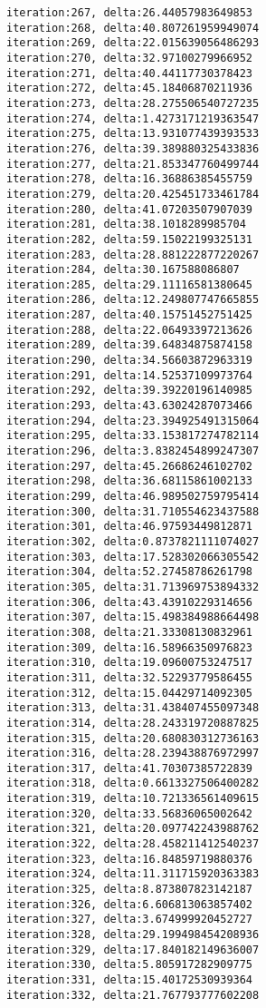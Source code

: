 \documentclass[11pt]{article}
\begin{document}
\begin{Verbatim}[commandchars=\\\{\}]
iteration:267, delta:26.44057983649853
iteration:268, delta:40.807261959949074
iteration:269, delta:22.015639056486293
iteration:270, delta:32.97100279966952
iteration:271, delta:40.44117730378423
iteration:272, delta:45.18406870211936
iteration:273, delta:28.275506540727235
iteration:274, delta:1.4273171219363547
iteration:275, delta:13.931077439393533
iteration:276, delta:39.389880325433836
iteration:277, delta:21.853347760499744
iteration:278, delta:16.36886385455759
iteration:279, delta:20.425451733461784
iteration:280, delta:41.07203507907039
iteration:281, delta:38.1018289985704
iteration:282, delta:59.15022199325131
iteration:283, delta:28.881222877220267
iteration:284, delta:30.167588086807
iteration:285, delta:29.11116581380645
iteration:286, delta:12.249807747665855
iteration:287, delta:40.15751452751425
iteration:288, delta:22.06493397213626
iteration:289, delta:39.64834875874158
iteration:290, delta:34.56603872963319
iteration:291, delta:14.52537109973764
iteration:292, delta:39.39220196140985
iteration:293, delta:43.63024287073466
iteration:294, delta:23.394925491315064
iteration:295, delta:33.153817274782114
iteration:296, delta:3.8382454899247307
iteration:297, delta:45.26686246102702
iteration:298, delta:36.68115861002133
iteration:299, delta:46.989502759795414
iteration:300, delta:31.710554623437588
iteration:301, delta:46.97593449812871
iteration:302, delta:0.8737821111074027
iteration:303, delta:17.528302066305542
iteration:304, delta:52.27458786261798
iteration:305, delta:31.713969753894332
iteration:306, delta:43.43910229314656
iteration:307, delta:15.498384988664498
iteration:308, delta:21.33308130832961
iteration:309, delta:16.58966350976823
iteration:310, delta:19.09600753247517
iteration:311, delta:32.52293779586455
iteration:312, delta:15.04429714092305
iteration:313, delta:31.438407455097348
iteration:314, delta:28.243319720887825
iteration:315, delta:20.680830312736163
iteration:316, delta:28.239438876972997
iteration:317, delta:41.70307385722839
iteration:318, delta:0.6613327506400282
iteration:319, delta:10.721336561409615
iteration:320, delta:33.56836065002642
iteration:321, delta:20.097742243988762
iteration:322, delta:28.458211412540237
iteration:323, delta:16.84859719880376
iteration:324, delta:11.311715920363383
iteration:325, delta:8.873807823142187
iteration:326, delta:6.606813063857402
iteration:327, delta:3.674999920452727
iteration:328, delta:29.199498454208936
iteration:329, delta:17.840182149636007
iteration:330, delta:5.805917282909775
iteration:331, delta:15.40172530939364
iteration:332, delta:21.767793777602208

\end{Verbatim}
\end{document}
